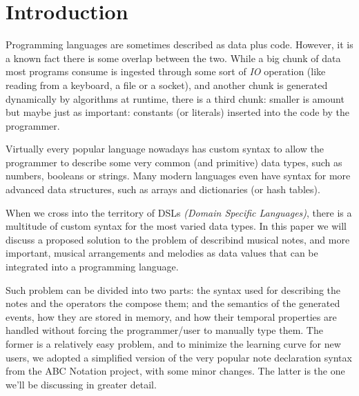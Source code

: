 \documentclass[a4paper,UKenglish,cleveref, autoref]{oasics-v2019}
\title{\ourtitle}
\author{Pedro M. Silva}{Dummy University Computing Laboratory, Portugal \and My second affiliation, Country \and \url{http://www.myhomepage.edu} }{johnqpublic@dummyuni.org}{https://orcid.org/0000-0002-1825-0097}{(Optional) author-specific funding acknowledgements}
\author{José João Almeida}%
       {Algoritmi, Departamento de Informática, Universidade do Minho, Braga, Portugal}%
       {jj@di.uminho.pt}%
       {https://orcid.org/0000-0002-0722-2031}
       {}
\begin{document}
\maketitle

\begin{abstract}
  In this paper, we'll discuss a simple approach to integrating musical events, such as notes or chords, into a programming language. First we'll analyze the problem and its particular requirements. Then we will discuss the solution we developed to meet those requirements. Finally we'll analyze the result and discuss possible alternative routes we could've taken.
\end{abstract}



\section{Introduction}
Programming languages are sometimes described as data plus code. However, it is a known fact there is some overlap between the two. While a big chunk of data most programs consume is ingested through some sort of \textit{IO} operation (like reading from a keyboard, a file or a socket), and another chunk is generated dynamically by algorithms at runtime, there is a third chunk: smaller is amount but maybe just as important: constants (or literals) inserted into the code by the programmer.

Virtually every popular language nowadays has custom syntax to allow the programmer to describe some very common (and primitive) data types, such as numbers, booleans or strings. Many modern languages even have syntax for more advanced data structures, such as arrays and dictionaries (or hash tables).

When we cross into the territory of DSLs \textit{(Domain Specific Languages)}, there is a multitude of custom syntax for the most varied data types. In this paper we will discuss a proposed solution to the problem of describind musical notes, and more important, musical arrangements and melodies as data values that can be integrated into a programming language.

Such problem can be divided into two parts: the syntax used for describing the notes and the operators the compose them; and the semantics of the generated events, how they are stored in memory, and how their temporal properties are handled without forcing the programmer/user to manually type them. The former is a relatively easy problem, and to minimize the learning curve for new users, we adopted a simplified version of the very popular note declaration syntax from the ABC Notation project\cite{AbcNotation}, with some minor changes. The latter is the one we'll be discussing in greater detail.
\end{document}
